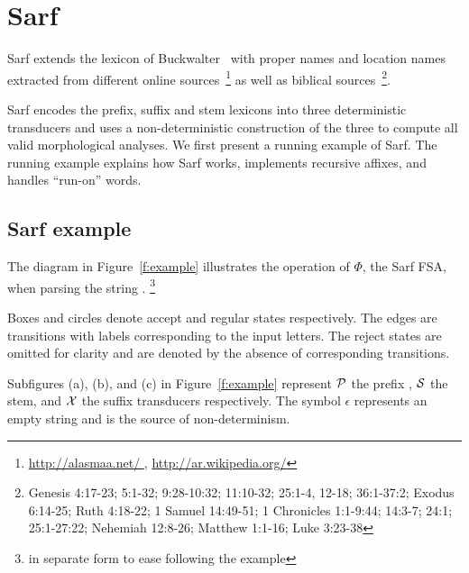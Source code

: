 \documentclass[11pt]{article}
\begin{document}
\section{Sarf}
\label{sec:sarf}

Sarf extends the lexicon of Buckwalter~ with
proper names and location names extracted from different online 
sources~\footnote{\href{http://alasmaa.net/}{http://alasmaa.net/ }, 
\href{http://ar.wikipedia.org/}{http://ar.wikipedia.org/}}
as well as biblical sources~\footnote{Genesis 4:17-23; 5:1-32; 9:28-10:32; 11:10-32; 25:1-4, 12-18; 36:1-37:2; Exodus 6:14-25; Ruth 4:18-22; 1 Samuel 14:49-51; 1 Chronicles 1:1-9:44; 14:3-7; 24:1; 25:1-27:22; Nehemiah 12:8-26; Matthew 1:1-16; Luke 3:23-38}.

Sarf encodes the prefix, suffix and stem lexicons into
three deterministic transducers and 
uses a non-deterministic construction
of the three to compute all valid morphological analyses.
We first present a running example of Sarf.
The running example explains how Sarf works,
implements recursive affixes, and
handles ``run-on'' words.

\subsection{Sarf example}
\label{sec:example}

\transfalse
\begin{figure}[tb]
\end{figure}
\transtrue


The diagram in Figure~\ref{f:example}
illustrates the operation of $\Phi$, the Sarf FSA,
when parsing the
string .
\footnote{ 
%
in separate form to ease following the example
}

Boxes and circles denote accept and regular
states respectively.
The edges are transitions with labels corresponding to
the input letters.
The reject states are omitted for clarity and are denoted
by the absence of corresponding transitions. 

Subfigures (a), (b), and (c) in Figure~\ref{f:example}
represent ${\cal P}$ the prefix ,
${\cal S}$ the stem, and ${\cal X}$ the suffix
transducers respectively. 
The symbol $\epsilon$ represents an empty string and is 
the source of non-determinism.
\end{document}
